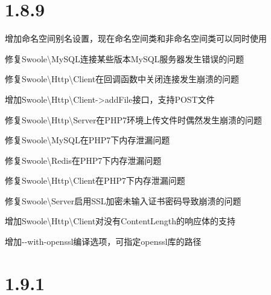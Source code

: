 \section{1.8.9}


\begin{compactitem}
\item 增加命名空间别名设置，现在命名空间类和非命名空间类可以同时使用
\item 修复Swoole\textbackslash MySQL连接某些版本MySQL服务器发生错误的问题
\item 修复Swoole\textbackslash Http\textbackslash Client在回调函数中关闭连接发生崩溃的问题
\item 增加Swoole\textbackslash Http\textbackslash Client->addFile接口，支持POST文件
\item 修复Swoole\textbackslash Http\textbackslash Server在PHP7环境上传文件时偶然发生崩溃的问题
\item 修复Swoole\textbackslash MySQL在PHP7下内存泄漏问题
\item 修复Swoole\textbackslash Redis在PHP7下内存泄漏问题
\item 修复Swoole\textbackslash Http\textbackslash Client在PHP7下内存泄漏问题
\item 修复Swoole\textbackslash Server启用SSL加密未输入证书密码导致崩溃的问题
\item 增加Swoole\textbackslash Http\textbackslash Client对没有ContentLength的响应体的支持
\item 增加-\/-with-openssl编译选项，可指定openssl库的路径
\end{compactitem}


\section{1.9.1}


